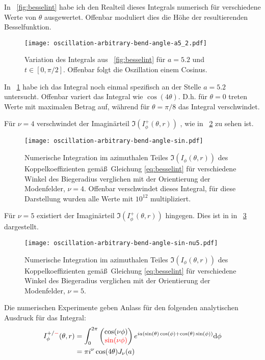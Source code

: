 \documentclass{article}
\def\({\left(}
\def\){\right)}
\newcommand{\figref}[1]{\figurename~\ref{#1}}
\begin{document}
In \figref{fig:besselint} habe ich den Realteil dieses Integrals
numerisch f\"ur verschiedene Werte von $\theta$ ausgewertet. Offenbar
moduliert dies die H\"ohe der resultierenden Besselfunktion.

\begin{figure}[!hbt]
  \centering
  \texttt{[image: oscillation-arbitrary-bend-angle-a5\_2.pdf]}
  \caption{Variation des Integrals aus \figref{fig:besselint} f\"ur
    $a=5.2$ und $t\in[0,\pi/2]$. Offenbar folgt die Oszillation
    einem Cosinus.}
  \label{fig:besselint2}
\end{figure}

In \figref{fig:besselint2} habe ich das Integral noch einmal
spezifisch an der Stelle $a=5.2$ untersucht. Offenbar variert das
Integral wie $\cos(4\theta)$. D.h. f\"ur $\theta=0$ treten Werte mit
maximalen Betrag auf, w\"ahrend f\"ur $\theta=\pi/8$ das Integral
verschwindet.

F\"ur $\nu=4$ verschwindet der Imagin\"arteil
$\Im\(I^+_\phi(\theta,r)\)$ , wie in \figref{fig:besselint-im} zu sehen
ist.
\begin{figure}[!hbt]
  \centering
  \texttt{[image: oscillation-arbitrary-bend-angle-sin.pdf]}
  \caption{Numerische Integration im azimuthalen Teiles
    $\Im\(I_\phi(\theta,r)\)$ des Koppelkoeffizienten
    gem\"a\ss\ Gleichung \eqref{eq:besselint} f\"ur verschiedene
    Winkel des Biegeradius verglichen mit der Orientierung der
    Modenfelder, $\nu=4$. Offenbar verschwindet dieses Integral, f\"ur
    diese Darstellung wurden alle Werte mit $10^{12}$ multipliziert.}
  \label{fig:besselint-im}
\end{figure}

F\"ur $\nu=5$ existiert der Imagin\"arteil $\Im\(I^+_\phi(\theta,r)\)$
hingegen. Dies ist in in \figref{fig:besselint-im-nu5} dargestellt.

\begin{figure}[!hbt]
  \centering
  \texttt{[image: oscillation-arbitrary-bend-angle-sin-nu5.pdf]}
  \caption{Numerische Integration im azimuthalen Teiles $\Im\(I_\phi(\theta,r)\)$ des
    Koppelkoeffizienten gem\"a\ss\ Gleichung \eqref{eq:besselint}
    f\"ur verschiedene Winkel des Biegeradius verglichen mit der
    Orientierung der Modenfelder, $\nu=5$.}
  \label{fig:besselint-im-nu5}
\end{figure}

Die numerischen Experimente geben Anlass f\"ur den folgenden analytischen Ausdruck f\"ur das Integral:
\begin{align}
  \label{eq:besselint}
  I^{+/\textcolor{red}{-}}_\phi(\theta,r) &= \int_0^{2\pi}
  \begin{pmatrix}
    \cos(\nu\phi)\\
    \textcolor{red}{\sin(\nu\phi)}
  \end{pmatrix}
  e^{ia(\sin(\theta)\cos(\phi)+\cos(\theta)\sin(\phi))} \textrm{d}\phi \\
  &=\pi i^\nu \cos(4\theta)  J_\nu(a)
\end{align}
\end{document}

